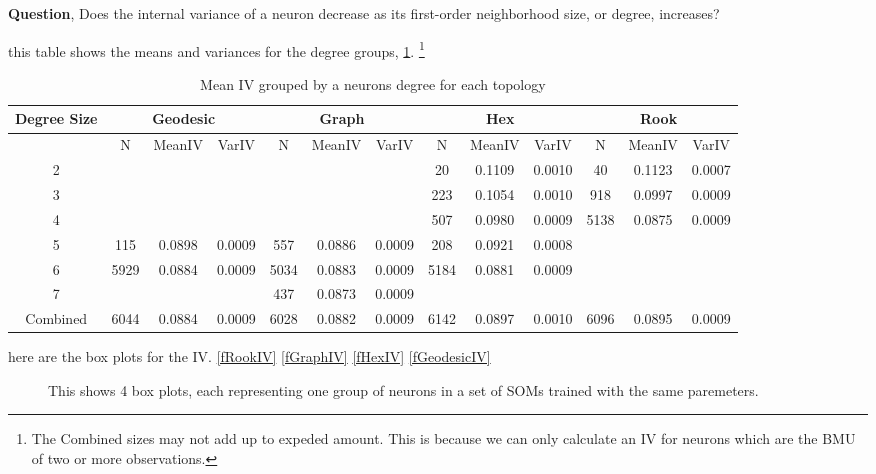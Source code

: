 \textbf{Question}, Does the internal variance of a neuron decrease as its first-order
neighborhood size, or degree, increases?



this table shows the means and variances for the degree groups,
\ref{meanvar1}. \footnote{The Combined sizes may not add up to expeded amount.
This is because we can only calculate an IV for neurons which are the BMU of
two or more observations.}

\begin{table}
\caption{Mean IV grouped by a neurons degree for each topology}
\label{meanvar1}
\begin{tabular}{|c||c|c|c||c|c|c||c|c|c||c|c|c|}
\hline
\textbf{Degree Size} & \multicolumn{3}{c||}{\textbf{Geodesic}} &
\multicolumn{3}{c||}{\textbf{Graph}} & \multicolumn{3}{c||}{\textbf{Hex}} &
\multicolumn{3}{c||}{\textbf{Rook}} \\
\hline
& N & MeanIV & VarIV & N & MeanIV & VarIV & N & MeanIV & VarIV & N & MeanIV &
VarIV \\
\hline
2&&&&&&& 20& 0.1109& 0.0010& 40& 0.1123& 0.0007\\ 
3&&&&&&& 223& 0.1054& 0.0010& 918& 0.0997& 0.0009\\ 
4&&&&&&& 507& 0.0980& 0.0009& 5138& 0.0875& 0.0009\\ 
5& 115& 0.0898& 0.0009& 557& 0.0886& 0.0009& 208& 0.0921& 0.0008&&&\\ 
6& 5929& 0.0884& 0.0009& 5034& 0.0883& 0.0009& 5184& 0.0881& 0.0009&&&\\ 
7&&&& 437& 0.0873& 0.0009&&&&&&\\ 
\hline 
Combined& 6044& 0.0884& 0.0009& 6028& 0.0882& 0.0009& 6142& 0.0897& 0.0010&
6096& 0.0895& 0.0009\\ 
\hline
\end{tabular} \end{table}




here are the box plots for the IV. \ref{fRookIV} \ref{fGraphIV} \ref{fHexIV}
\ref{fGeodesicIV}


\begin{figure}
\label{boxplot}
\centering
{}
\caption{This shows 4 box plots, each representing one group of neurons in a set
of SOMs trained with the same paremeters.}
\end{figure}




